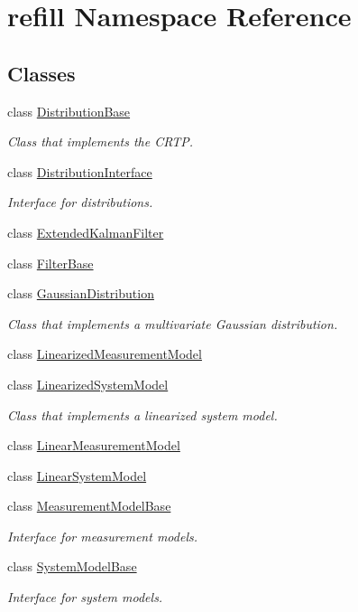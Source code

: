 \hypertarget{namespacerefill}{}\section{refill Namespace Reference}
\label{namespacerefill}
\subsection*{Classes}
\begin{DoxyCompactItemize}
\item 
class \hyperlink{classrefill_1_1DistributionBase}{Distribution\+Base}
\begin{DoxyCompactList}\small\item\em Class that implements the C\+R\+TP. \end{DoxyCompactList}\item 
class \hyperlink{classrefill_1_1DistributionInterface}{Distribution\+Interface}
\begin{DoxyCompactList}\small\item\em Interface for distributions. \end{DoxyCompactList}\item 
class \hyperlink{classrefill_1_1ExtendedKalmanFilter}{Extended\+Kalman\+Filter}
\item 
class \hyperlink{classrefill_1_1FilterBase}{Filter\+Base}
\item 
class \hyperlink{classrefill_1_1GaussianDistribution}{Gaussian\+Distribution}
\begin{DoxyCompactList}\small\item\em Class that implements a multivariate Gaussian distribution. \end{DoxyCompactList}\item 
class \hyperlink{classrefill_1_1LinearizedMeasurementModel}{Linearized\+Measurement\+Model}
\item 
class \hyperlink{classrefill_1_1LinearizedSystemModel}{Linearized\+System\+Model}
\begin{DoxyCompactList}\small\item\em Class that implements a linearized system model. \end{DoxyCompactList}\item 
class \hyperlink{classrefill_1_1LinearMeasurementModel}{Linear\+Measurement\+Model}
\item 
class \hyperlink{classrefill_1_1LinearSystemModel}{Linear\+System\+Model}
\item 
class \hyperlink{classrefill_1_1MeasurementModelBase}{Measurement\+Model\+Base}
\begin{DoxyCompactList}\small\item\em Interface for measurement models. \end{DoxyCompactList}\item 
class \hyperlink{classrefill_1_1SystemModelBase}{System\+Model\+Base}
\begin{DoxyCompactList}\small\item\em Interface for system models. \end{DoxyCompactList}\end{DoxyCompactItemize}
